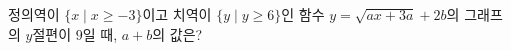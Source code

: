 정의역이 $\{x \mid x\ge -3\}$이고 치역이 $\{y \mid y\ge 6\}$인 함수 $y=\sqrt{ax+3a}+2b$의 그래프의 $y$절편이 $9$일 때, $a+b$의 값은? 
